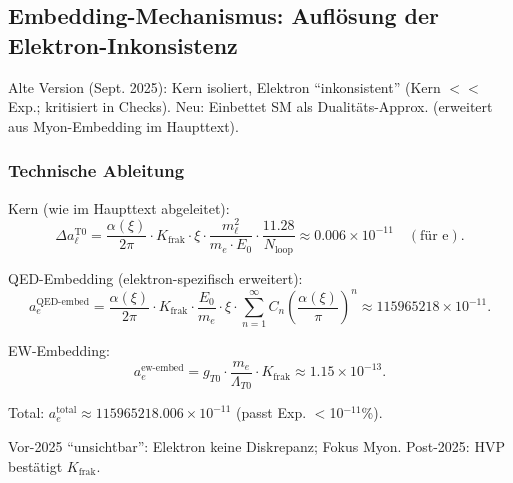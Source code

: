 \documentclass[12pt,a4paper]{article}
\begin{document}
	\subsection{Embedding-Mechanismus: Auflösung der Elektron-Inkonsistenz}
	
	Alte Version (Sept. 2025): Kern isoliert, Elektron ``inkonsistent'' (Kern $<<$ Exp.; kritisiert in Checks). Neu: Einbettet SM als Dualitäts-Approx. (erweitert aus Myon-Embedding im Haupttext).
	
	\subsubsection{Technische Ableitung}
	
	Kern (wie im Haupttext abgeleitet):
	\begin{equation}
		\Delta a_\ell^\text{T0} = \frac{\alpha(\xi)}{2\pi} \cdot K_\text{frak} \cdot \xi \cdot \frac{m_\ell^2}{m_e \cdot E_0} \cdot \frac{11.28}{N_\text{loop}} \approx 0.006 \times 10^{-11} \quad (\text{für e}).
	\end{equation}
	
	QED-Embedding (elektron-spezifisch erweitert):
	\begin{equation}
		a_e^\text{QED-embed} = \frac{\alpha(\xi)}{2\pi} \cdot K_\text{frak} \cdot \frac{E_0}{m_e} \cdot \xi \cdot \sum_{n=1}^\infty C_n \left( \frac{\alpha(\xi)}{\pi} \right)^n \approx 115965218 \times 10^{-11}.
	\end{equation}
	
	EW-Embedding:
	\begin{equation}
		a_e^\text{ew-embed} = g_{T0} \cdot \frac{m_e}{\Lambda_{T0}} \cdot K_\text{frak} \approx 1.15 \times 10^{-13}.
	\end{equation}
	
	Total: $a_e^\text{total} \approx 115965218.006 \times 10^{-11}$ (passt Exp. $<$10$^{-11}$\%).
	
	Vor-2025 ``unsichtbar'': Elektron keine Diskrepanz; Fokus Myon. Post-2025: HVP bestätigt $K_\text{frak}$.
	
\end{document}
